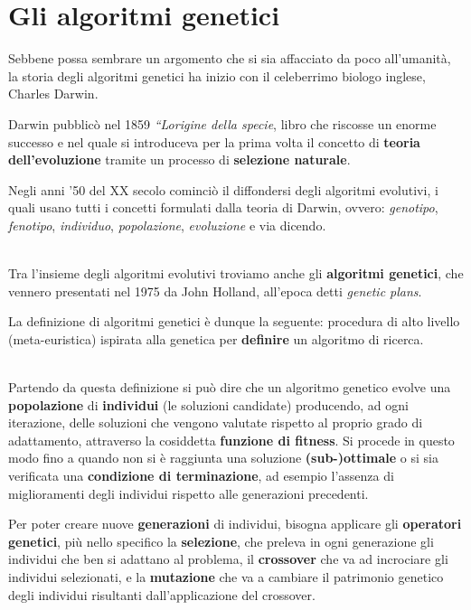 \documentclass[a4paper, 11pt, oneside]{report}
\begin{document}
            \section{Gli algoritmi genetici}
            Sebbene possa sembrare un argomento che si sia affacciato da poco all'umanità, la storia degli algoritmi genetici
            ha inizio con il celeberrimo biologo inglese, Charles Darwin.
            \par \noindent Darwin pubblicò nel 1859 \textit{``Lorigine della specie}, libro che riscosse un enorme
            successo e nel quale si introduceva per la prima volta il concetto di \textbf{teoria dell'evoluzione} tramite
            un processo di \textbf{selezione naturale}.
            \par \noindent Negli anni '50 del XX secolo cominciò il diffondersi degli algoritmi evolutivi,
            i quali usano tutti i concetti formulati dalla teoria di Darwin, ovvero:
            \textit{genotipo}, \textit{fenotipo}, \textit{individuo}, \textit{popolazione}, \textit{evoluzione} e via dicendo.
            \par \noindent
            \\ \noindent Tra l'insieme degli algoritmi evolutivi troviamo anche gli \textbf{algoritmi genetici}, che vennero
            presentati nel 1975 da John Holland, all'epoca detti \textit{genetic plans}.
            \par \noindent La definizione di algoritmi genetici è dunque la seguente:
            procedura di alto livello (meta-euristica) ispirata alla genetica per \textbf{definire}
            un algoritmo di ricerca.
            \par \noindent
            \\ \noindent Partendo da questa definizione si può dire che un algoritmo genetico evolve una \textbf{popolazione}
            di \textbf{individui} (le soluzioni candidate) producendo, ad ogni iterazione, delle
            soluzioni che vengono valutate rispetto al proprio grado di adattamento, attraverso la cosiddetta
            \textbf{funzione di fitness}. Si procede in questo modo fino a quando non si è raggiunta
            una soluzione \textbf{(sub-)ottimale} o si sia verificata una \textbf{condizione di terminazione}, ad esempio
            l'assenza di miglioramenti degli individui rispetto alle generazioni precedenti.
            \par \noindent Per poter creare nuove \textbf{generazioni} di individui, bisogna applicare gli \textbf{operatori genetici},
            più nello specifico la \textbf{selezione}, che preleva in ogni generazione gli individui che ben si
            adattano al problema, il \textbf{crossover} che va ad incrociare gli individui selezionati, e la \textbf{mutazione} che
            va a cambiare il patrimonio genetico degli individui risultanti dall'applicazione del crossover.
\end{document}
